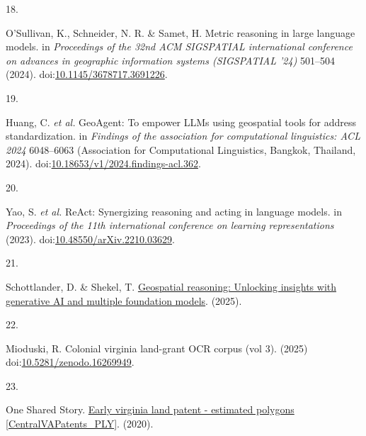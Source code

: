 \documentclass[
  10pt,
  twocolumn]{article}
\newlength{\cslhangindent}
\newlength{\csllabelwidth}
\newenvironment{CSLReferences}[2] %
 {\begin{list}{}{%
  \setlength{\itemindent}{0pt}
  \setlength{\leftmargin}{0pt}
  \setlength{\parsep}{0pt}
  \ifodd #1
   \setlength{\leftmargin}{\cslhangindent}
   \setlength{\itemindent}{-1\cslhangindent}
  \fi
  \setlength{\itemsep}{#2\baselineskip}}}
 {\end{list}}
\newcommand{\CSLLeftMargin}[1]{\parbox[t]{\csllabelwidth}{\strut#1\strut}}
\newcommand{\CSLRightInline}[1]{\parbox[t]{\linewidth - \csllabelwidth}{\strut#1\strut}}
\begin{document}
\begin{CSLReferences}{0}{0}
\CSLLeftMargin{18. }%
\CSLRightInline{O'Sullivan, K., Schneider, N. R. \& Samet, H. Metric
reasoning in large language models. in \emph{Proceedings of the 32nd ACM
SIGSPATIAL international conference on advances in geographic
information systems (SIGSPATIAL '24)} 501--504 (2024).
doi:\href{https://doi.org/10.1145/3678717.3691226}{10.1145/3678717.3691226}.}

\CSLLeftMargin{19. }%
\CSLRightInline{Huang, C. \emph{et al.} GeoAgent: To empower LLMs using
geospatial tools for address standardization. in \emph{Findings of the
association for computational linguistics: ACL 2024} 6048--6063
(Association for Computational Linguistics, Bangkok, Thailand, 2024).
doi:\href{https://doi.org/10.18653/v1/2024.findings-acl.362}{10.18653/v1/2024.findings-acl.362}.}

\CSLLeftMargin{20. }%
\CSLRightInline{Yao, S. \emph{et al.} ReAct: Synergizing reasoning and
acting in language models. in \emph{Proceedings of the 11th
international conference on learning representations} (2023).
doi:\href{https://doi.org/10.48550/arXiv.2210.03629}{10.48550/arXiv.2210.03629}.}

\CSLLeftMargin{21. }%
\CSLRightInline{Schottlander, D. \& Shekel, T.
\href{https://research.google/blog/geospatial-reasoning-unlocking-insights-with-generative-ai-and-multiple-foundation-models/}{Geospatial
reasoning: Unlocking insights with generative AI and multiple foundation
models}. (2025).}

\CSLLeftMargin{22. }%
\CSLRightInline{Mioduski, R. Colonial virginia land-grant OCR corpus
(vol 3). (2025)
doi:\href{https://doi.org/10.5281/zenodo.16269949}{10.5281/zenodo.16269949}.}

\CSLLeftMargin{23. }%
\CSLRightInline{One Shared Story.
\href{https://www.arcgis.com/home/item.html?id=6fc329e0694b497196435beba8244a47}{Early
virginia land patent - estimated polygons {[}CentralVAPatents\_PLY{]}}.
(2020).}

\end{CSLReferences}
\end{document}
